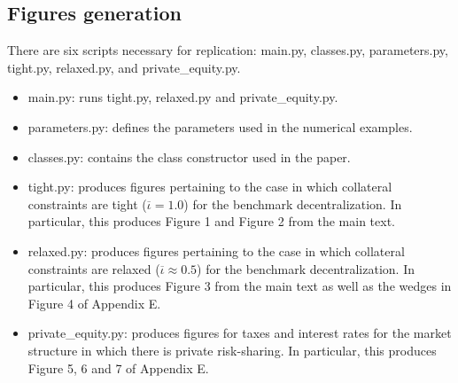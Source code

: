\documentclass[11pt]{article}
\theoremstyle{plain}
\theoremstyle{definition} %
\begin{document}
\subsection*{Figures generation}

There are six scripts necessary for replication: main.py, classes.py, parameters.py, tight.py, relaxed.py, and private\_equity.py. 

\begin{itemize}
\item main.py: runs tight.py, relaxed.py and private\_equity.py.
\item parameters.py: defines the parameters used in the numerical examples.
\item classes.py: contains the class constructor used in the paper.
\item tight.py: produces figures pertaining to the case in which collateral constraints are tight ($\overline{\iota} = 1.0$) for the benchmark decentralization. In particular, this produces Figure 1 and Figure 2 from the main text. 
\item relaxed.py: produces figures pertaining to the case in which collateral constraints are relaxed ($\overline{\iota} \approx 0.5$) for the benchmark decentralization. In particular, this produces Figure 3 from the main text as well as the wedges in Figure 4 of Appendix E. 
\item private\_equity.py: produces figures for taxes and interest rates for the market structure in which there is private risk-sharing. In particular, this produces Figure 5, 6 and 7 of Appendix E. 
\end{itemize}



%

%
\end{document}
